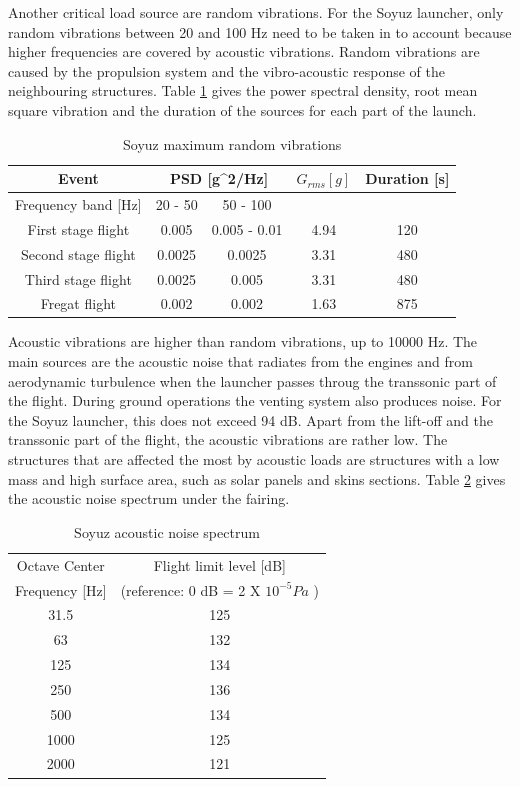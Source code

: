 Another critical load source are random vibrations. For the Soyuz launcher, only random vibrations between 20 and 100 Hz need to be taken in to account because higher frequencies are covered by acoustic vibrations. Random vibrations are caused by the propulsion system and the vibro-acoustic response of the neighbouring structures. Table \ref{tab:random_vibr} gives the power spectral density, root mean square vibration and the duration of the sources for each part of the launch.

\begin{table}[H!]
\centering
\begin{tabular}{ccccc}
\toprule
 Event & \multicolumn{2}{c}{PSD [g^2/Hz]} & $G_{rms} [g]$ & Duration [s] \\
 \midrule
 Frequency band [Hz] & 20 - 50 & 50 - 100 & & \\
 \midrule
 First stage flight & 0.005 & 0.005 - 0.01 & 4.94 & 120 \\
 Second stage flight & 0.0025 & 0.0025 & 3.31 & 480 \\
 Third stage flight & 0.0025 & 0.005 & 3.31 & 480 \\
 Fregat flight & 0.002 & 0.002 & 1.63 & 875 \\
 \bottomrule
 \end{tabular}
 \caption{Soyuz maximum random vibrations}
\label{tab:random_vibr}
\end{table}

Acoustic vibrations are higher than random vibrations, up to 10000 Hz. The main sources are the acoustic noise that radiates from the engines and from aerodynamic turbulence when the launcher passes throug the transsonic part of the flight. During ground operations the venting system also produces noise. For the Soyuz launcher, this does not exceed 94 dB. Apart from the lift-off and the transsonic part of the flight, the acoustic vibrations are rather low. The structures that are affected the most by acoustic loads are structures with a low mass and high surface area, such as solar panels and skins sections. Table \ref{tab:acoustic_vibr} gives the acoustic noise spectrum under the fairing.

\begin{table}[H!]
\centering
\begin{tabular}{cc}
\toprule
Octave Center & Flight limit level [dB]\\
Frequency [Hz] & (reference: 0 dB = 2 X $10^{-5} Pa$ ) \\
\midrule
31.5 & 125\\
63 & 132 \\
125 & 134 \\
250 & 136 \\
500 & 134 \\
1000 & 125 \\
2000 & 121 \\
\bottomrule
 \end{tabular}
 \caption{Soyuz acoustic noise spectrum}
\label{tab:acoustic_vibr}
\end{table}

